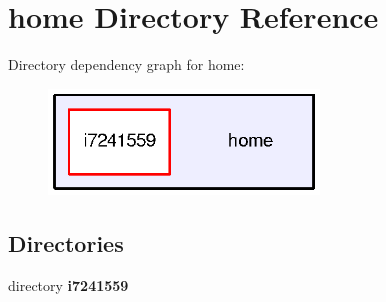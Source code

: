 \section{home Directory Reference}
\label{dir_75b82e7e4a5feb05200b9ad7adf06257}
Directory dependency graph for home\-:
\nopagebreak
\begin{figure}[H]
\begin{center}
\leavevmode
\includegraphics[width=204pt]{dir_75b82e7e4a5feb05200b9ad7adf06257_dep}
\end{center}
\end{figure}
\subsection*{Directories}
\begin{DoxyCompactItemize}
\item 
directory {\bf i7241559}
\end{DoxyCompactItemize}
